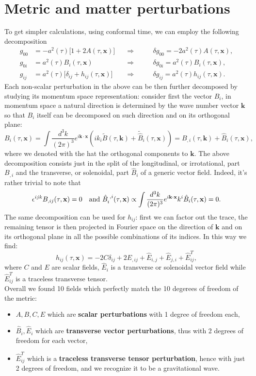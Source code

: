 \section{Metric and matter perturbations}
\label{sec:perturbations}
To get simpler calculations, using conformal time, we can employ the following decomposition
\begin{align}
    g_{00}&=-a^2(\tau)\bigg[1+2A(\tau,\mathbf x)\bigg]\quad&\Rightarrow\qquad&\delta g_{00}=-2a^2(\tau)A(\tau,\mathbf x),\\
    g_{0i}&=a^2(\tau)B_i(\tau,\mathbf x)\quad&\Rightarrow\qquad&\delta g_{0i}=a^2(\tau)B_i(\tau,\mathbf x),\\
    g_{ij}&=a^2(\tau)\bigg[\delta_{ij}+h_{ij}(\tau,\mathbf x)\bigg]\quad&\Rightarrow\qquad&\delta g_{ij}=a^2(\tau)h_{ij}(\tau,\mathbf x).
\end{align} 
Each non-scalar perturbation in the above can be then further decomposed by studying its momentum space representation: consider first the vector $B_i$, in momentum space a natural direction is determined by the wave number vector $\mathbf k$ so that $B_i$ itself can be decomposed on such direction and on its orthogonal plane: $$B_i(\tau,\mathbf x)=\int\frac{d^3k}{(2\pi)^3}e^{i\mathbf{k\cdot x}}(ik_i\tilde B(\tau,\mathbf k)+\tilde{\hat{B}}_i(\tau,\mathbf x))=B_{,i}(\tau,\mathbf k)+\hat{B}_i(\tau,\mathbf x),$$ where we denoted with the hat the orthogonal components to $\mathbf{k}$. The above decomposition consists just in the split of the longitudinal, or irrotational, part $B_{,i}$ and the transverse, or solenoidal, part $\hat{ B}_i$ of a generic vector field. Indeed, it's rather trivial to note that $$\epsilon^{ijk}B_{,ij}(\tau,\mathbf x)=0\quad\text{and } \tensor{\hat B}{_{i}^{,i}}(\tau,\mathbf x)\propto\int\frac{d^3k}{(2\pi)^3}e^{i\mathbf{k\cdot x}}k^i\hat{B}_i(\tau,\mathbf x)=0.$$
The same decomposition can be used for $h_{ij}$: first we can factor out the trace, the remaining tensor is then projected in Fourier space on the direction of $\mathbf{k}$ and on its orthogonal plane in all the possible combinations of its indices. In this way we find:
$$h_{ij}(\tau,\mathbf x)=-2C\delta_{ij}+2E_{,ij}+\hat E_{i,j}+\hat E_{j,i}+\hat E^{T}_{ij},$$ where $C$ and $E$ are scalar fields, $\hat E_i$ is a transverse or solenoidal vector field while $\hat E^{T}_{ij}$ is a traceless transverse tensor.\\ Overall we found 10 fields which perfectly match the 10 degerees of freedom of the metric:
\begin{itemize}
    \item $A,B,C,E$ which are \textbf{scalar perturbations} with 1 degree of freedom each,
    \item $\hat B_i,\hat E_i$ which are \textbf{transverse vector perturbations}, thus with 2 degrees of freedom for each vector,
    \item $\hat E^T_{ij}$ which is a \textbf{traceless transverse tensor perturbation}, hence with just 2 degrees of freedom, and we recognize it to be a gravitational wave.
\end{itemize}


